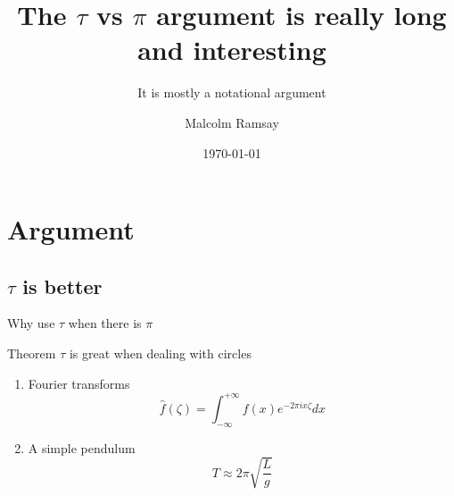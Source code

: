 \documentclass[aspectratio=169, 22pt]{beamer}
\title{The $\tau$ vs $\pi$ argument is really long and interesting}
\subtitle{It is mostly a notational argument}
\date{\today}
\author[Malcolm]{Malcolm Ramsay}
\begin{document}
\begin{frame}
  \titlepage{}
\end{frame}

\section{Argument}
\subsection{$\tau$ is better}

\begin{frame}{Why use $\tau$ when there is $\pi$}
  \begin{block}{Theorem}
    $\tau$ is great when dealing with circles
  \end{block}

  \begin{enumerate}
    \item<1-> Fourier transforms
      \begin{equation}
        \hat f(\zeta) = \int_{-\infty}^{+\infty} f(x) e^{-2\pi ix\zeta} dx
      \end{equation}
    \item<2-> A simple pendulum
      \begin{equation}
        T \approx 2\pi \sqrt{\frac{L}{g}}
      \end{equation}
  \end{enumerate}
\end{frame}
\end{document}
